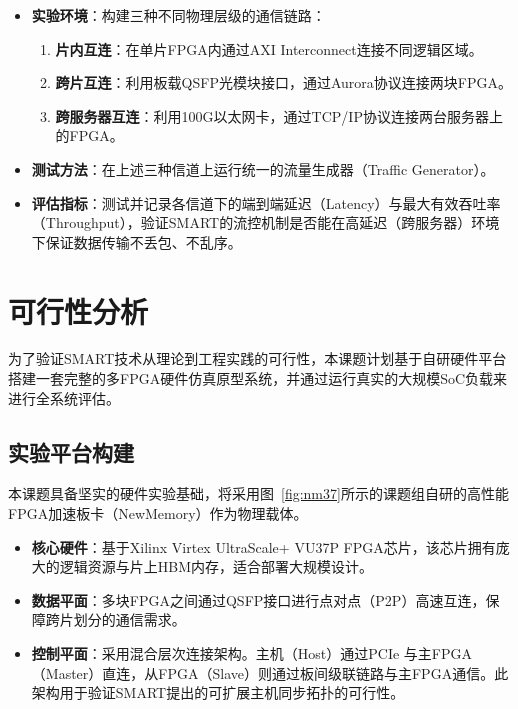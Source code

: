 \begin{itemize}
    \item \textbf{实验环境}：构建三种不同物理层级的通信链路：
          \begin{enumerate}
              \item \textbf{片内互连}：在单片FPGA内通过AXI Interconnect连接不同逻辑区域。
              \item \textbf{跨片互连}：利用板载QSFP光模块接口，通过Aurora协议连接两块FPGA。
              \item \textbf{跨服务器互连}：利用100G以太网卡，通过TCP/IP协议连接两台服务器上的FPGA。
          \end{enumerate}
    \item \textbf{测试方法}：在上述三种信道上运行统一的流量生成器（Traffic Generator）。
    \item \textbf{评估指标}：测试并记录各信道下的端到端延迟（Latency）与最大有效吞吐率（Throughput），验证SMART的流控机制是否能在高延迟（跨服务器）环境下保证数据传输不丢包、不乱序。
\end{itemize}

\section{可行性分析}

为了验证SMART技术从理论到工程实践的可行性，本课题计划基于自研硬件平台搭建一套完整的多FPGA硬件仿真原型系统，并通过运行真实的大规模SoC负载来进行全系统评估。

\subsection{实验平台构建}

本课题具备坚实的硬件实验基础，将采用图~\ref{fig:nm37}所示的课题组自研的高性能FPGA加速板卡（NewMemory）作为物理载体。
\begin{itemize}
    \item \textbf{核心硬件}：基于Xilinx Virtex UltraScale+ VU37P FPGA芯片，该芯片拥有庞大的逻辑资源与片上HBM内存，适合部署大规模设计。
    \item \textbf{数据平面}：多块FPGA之间通过QSFP接口进行点对点（P2P）高速互连，保障跨片划分的通信需求。
    \item \textbf{控制平面}：采用混合层次连接架构。主机（Host）通过PCIe 与主FPGA（Master）直连，从FPGA（Slave）则通过板间级联链路与主FPGA通信。此架构用于验证SMART提出的可扩展主机同步拓扑的可行性。
\end{itemize}

